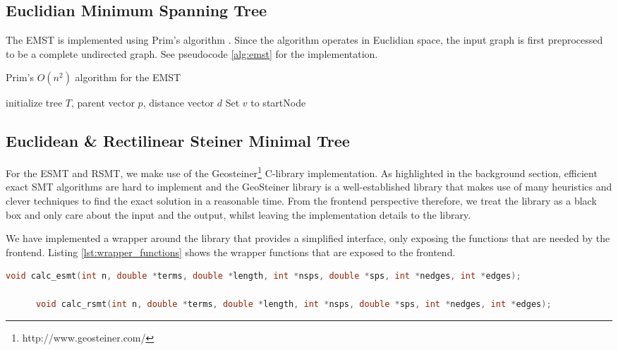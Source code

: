 \documentclass{l4proj}
\begin{document}
\wrapstuffclear
\subsection{Euclidian Minimum Spanning Tree}
The EMST is implemented using Prim's algorithm \citep[pp. 194--195]{Skiena2008}. Since the algorithm operates in Euclidian space, the input graph is first preprocessed to be a complete undirected graph. See pseudocode \ref{alg:emst} for the implementation.

\begin{algorithm}
    \caption{Prim's $O(n^2)$ algorithm for the EMST}
    \label{alg:emst}
    \SetAlgoLined
    initialize tree $T$, parent vector $p$, distance vector $d$\;
    Set $v$ to startNode\;
    \;
\end{algorithm}

\subsection{Euclidean \& Rectilinear Steiner Minimal Tree}
For the ESMT and RSMT, we make use of the Geosteiner\footnote{http://www.geosteiner.com/} C-library implementation. As highlighted in the background section, efficient exact SMT algorithms are hard to implement and the GeoSteiner library is a well-established library that makes use of many heuristics and clever techniques to find the exact solution in a reasonable time.
From the frontend perspective therefore, we treat the library as a black box and only care about the input and the output, whilst leaving the implementation details to the library.

We have implemented a wrapper around the library that provides a simplified interface, only exposing the functions that are needed by the frontend. Listing \ref{lst:wrapper_functions} shows the wrapper functions that are exposed to the frontend.

\begin{lstlisting}[language=C,caption=Wrapper functions for the Geosteiner library,label=lst:wrapper_functions]
      void calc_esmt(int n, double *terms, double *length, int *nsps, double *sps, int *nedges, int *edges);

      void calc_rsmt(int n, double *terms, double *length, int *nsps, double *sps, int *nedges, int *edges);
\end{lstlisting}
\end{document}
